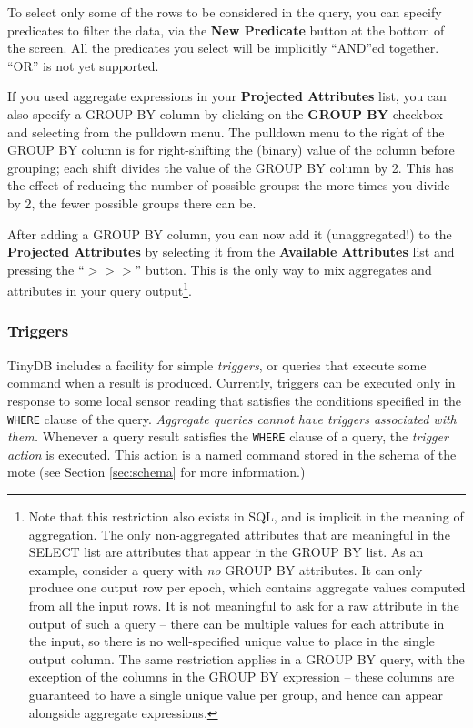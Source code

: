 \documentclass[11pt]{article}
\begin{document}
To select only some of the rows to be considered in the query, you can
specify predicates to filter the data,
via the {\bf New Predicate} button at the bottom of the screen.  All
the predicates you select will be implicitly ``AND''ed together.  ``OR'' is
not yet supported.

If you used aggregate expressions in your {\bf Projected
Attributes} list, you can also specify a GROUP BY column by
clicking on the {\bf GROUP BY} checkbox and selecting from the
pulldown menu.  The pulldown menu to the right of the GROUP BY column
is for right-shifting the (binary) value of the column before
grouping; each shift divides the value of the GROUP BY column by 2.
This has the effect of reducing the number of possible groups: the
more times you divide by 2, the fewer possible groups there can be.

After adding a GROUP BY column, you can now add it (unaggregated!) to
the {\bf Projected Attributes} by selecting it from the {\bf Available
Attributes} list and pressing the ``$>>>$'' button.  This is the only
way to mix aggregates and attributes in your query
output\footnote{Note that this restriction also exists in SQL, and is
implicit in the meaning of aggregation.  The only non-aggregated
attributes that are meaningful in the SELECT list are attributes that
appear in the GROUP BY list.  As an example, consider a query
with {\em no} GROUP BY attributes.  It can only produce one output row
per epoch, which contains aggregate values computed from all the
input rows.  It is not meaningful to ask for a raw attribute in the
output of such a query -- there can be multiple values for each
attribute in the input, so there is no well-specified unique value to
place in the single output column.  The same restriction applies in a
GROUP BY query, with the exception of the columns in the GROUP BY
expression -- these columns are guaranteed to have a
single unique value per group, and hence can appear alongside aggregate
expressions.}.

\subsubsection{Triggers}\label{sec:triggers}

TinyDB includes a facility for simple {\it triggers}, or queries
that execute some command when a result is produced.  Currently, triggers can be
executed only in response to some local sensor reading that satisfies the conditions
specified in the {\tt WHERE} clause of the query.  {\it Aggregate queries cannot
have triggers associated with them.}  Whenever a query result satisfies the
{\tt WHERE} clause of a query, the {\it trigger action} is executed.  This
action is a named command stored in the schema of the mote (see Section \ref{sec:schema}
for more information.)  
\end{document}

